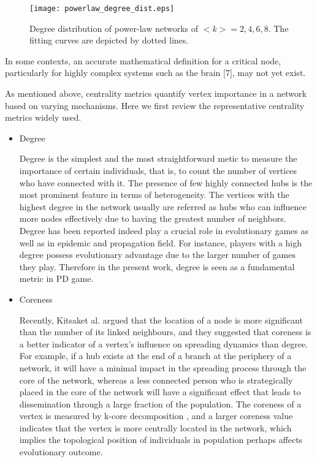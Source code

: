 \documentclass[preprint,12pt,3p]{elsarticle}
\begin{document}
\begin{figure}
  \centering
  \texttt{[image: powerlaw\_degree\_dist.eps]}
  \caption{Degree distribution of power-law networks of $<k>=2,4,6,8$.
  The fitting curves are depicted by dotted lines.}
  \label{fig_degree}
\end{figure}


\label{centrality,option, corr}
In some contexts, an accurate mathematical
definition for a critical node, particularly for highly complex systems such as the
brain [7], may not yet exist.

As mentioned above, centrality metrics quantify vertex importance in a network based on varying mechanisms.
Here we first review the representative centrality metrics widely used.
\begin{itemize}

\item Degree

Degree is the simplest and the most straightforward metic to measure the importance
of certain individuals, that is, to count the number of vertices who have connected with it.
The presence of few highly connected hubs is the most prominent feature in terms of heterogeneity.
The vertices with the highest degree in the network usually are referred as hubs who
can influence more nodes effectively due to having the greatest number of neighbors.
Degree has been reported indeed play a crucial role in evolutionary games as well as in epidemic and propagation field.
For instance, players with a high degree possess evolutionary advantage due to the larger
number of games they play.
Therefore in the present work, degree is seen as a fundamental metric in PD game.

\item Coreness

Recently, Kitsaket al. \cite{KitsakGallos-17826} argued that the location of a node is
more significant than the number of its linked neighbours, and
they suggested that coreness is a better indicator of a vertex’s
influence on spreading dynamics than degree.
For example, if a hub exists at the end of a branch
at the periphery of a network, it will have a minimal impact
in the spreading process through the core of the network,
whereas a less connected person who is strategically placed in
the core of the network will have a significant effect that leads
to dissemination through a large fraction of the population.
The coreness of a vertex is measured by k-core decomposition \cite{DorogovtsevGoltsev-18309} ,
and a larger coreness value indicates that the vertex is more centrally located in
the network, which implies the topological position of individuals in population perhaps affects evolutionary outcome.


\end{itemize}
\end{document}
